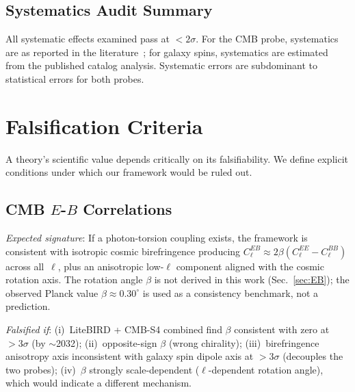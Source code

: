 \documentclass[aps,prd,twocolumn,superscriptaddress,showpacs,preprintnumbers,nofootinbib,longbibliography,floatfix]{revtex4-2}
\begin{document}
\subsection{Systematics Audit Summary}

All systematic effects examined pass at $< 2\sigma$. For the CMB probe, systematics are as reported in the literature~\cite{Minami2020,Eskilt2022}; for galaxy spins, systematics are estimated from the published catalog analysis. Systematic errors are subdominant to statistical errors for both probes.




\section{Falsification Criteria}\label{sec:falsification}

A theory's scientific value depends critically on its falsifiability. We define explicit conditions under which our framework would be ruled out.

\subsection{CMB $E$-$B$ Correlations}

\textit{Expected signature}: If a photon-torsion coupling exists, the framework is consistent with isotropic cosmic birefringence producing $C_\ell^{EB}\approx 2\beta(C_\ell^{EE}-C_\ell^{BB})$ across all~$\ell$, plus an anisotropic low-$\ell$ component aligned with the cosmic rotation axis. The rotation angle $\beta$ is not derived in this work (Sec.~\ref{sec:EB}); the observed Planck value $\beta\approx 0.30^\circ$ is used as a consistency benchmark, not a prediction.

\textit{Falsified if}: (i)~LiteBIRD + CMB-S4 combined find $\beta$ consistent with zero at $>3\sigma$ (by $\sim$2032); (ii)~opposite-sign $\beta$ (wrong chirality); (iii)~birefringence anisotropy axis inconsistent with galaxy spin dipole axis at $>3\sigma$ (decouples the two probes); (iv)~$\beta$ strongly scale-dependent ($\ell$-dependent rotation angle), which would indicate a different mechanism.
\end{document}
